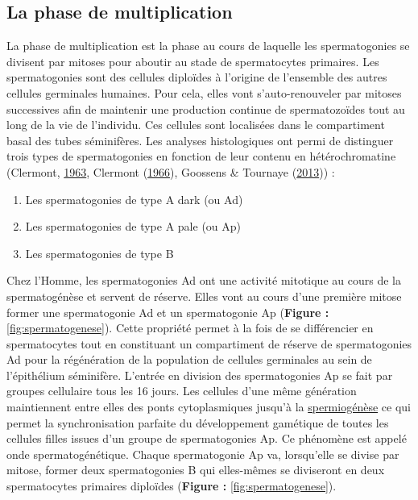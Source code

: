 \documentclass[12pt,twoside]{reedthesis}
\providecommand{\tightlist}{%
  \setlength{\itemsep}{0pt}\setlength{\parskip}{0pt}}
\theoremstyle{definition}
\theoremstyle{definition}
\theoremstyle{remark}
\begin{document}
  \subsection{La phase de
  multiplication}\label{la-phase-de-multiplication}
  
  La phase de multiplication est la phase au cours de laquelle les
  spermatogonies se divisent par mitoses pour aboutir au stade de
  spermatocytes primaires. Les spermatogonies sont des cellules diploïdes
  à l'origine de l'ensemble des autres cellules germinales humaines. Pour
  cela, elles vont s'auto-renouveler par mitoses successives afin de
  maintenir une production continue de spermatozoïdes tout au long de la
  vie de l'individu. Ces cellules sont localisées dans le compartiment
  basal des tubes séminifères. Les analyses histologiques ont permi de
  distinguer trois types de spermatogonies en fonction de leur contenu en
  hétérochromatine (Clermont, \protect\hyperlink{ref-Clermont1963}{1963},
  Clermont (\protect\hyperlink{ref-Clermont1966}{1966}), Goossens \&
  Tournaye (\protect\hyperlink{ref-Goossens2013}{2013})) :
  
  \begin{enumerate}
  \def\labelenumi{\arabic{enumi}.}
  \tightlist
  \item
    Les spermatogonies de type A dark (ou Ad)\\
  \item
    Les spermatogonies de type A pale (ou Ap)\\
  \item
    Les spermatogonies de type B
  \end{enumerate}
  
  Chez l'Homme, les spermatogonies Ad ont une activité mitotique au cours
  de la spermatogénèse et servent de réserve. Elles vont au cours d'une
  première mitose former une spermatogonie Ad et un spermatogonie Ap
  (\textbf{Figure :} \ref{fig:spermatogenese}). Cette propriété permet à
  la fois de se différencier en spermatocytes tout en constituant un
  compartiment de réserve de spermatogonies Ad pour la régénération de la
  population de cellules germinales au sein de l'épithélium séminifère.
  L'entrée en division des spermatogonies Ap se fait par groupes
  cellulaire tous les 16 jours. Les cellules d'une même génération
  maintiennent entre elles des ponts cytoplasmiques jusqu'à la
  \protect\hyperlink{spermiogenese}{spermiogénèse} ce qui permet la
  synchronisation parfaite du développement gamétique de toutes les
  cellules filles issues d'un groupe de spermatogonies Ap. Ce phénomène
  est appelé onde spermatogénétique. Chaque spermatogonie Ap va,
  lorsqu'elle se divise par mitose, former deux spermatogonies B qui
  elles-mêmes se diviseront en deux spermatocytes primaires diploïdes
  (\textbf{Figure :} \ref{fig:spermatogenese}).
  
\end{document}
